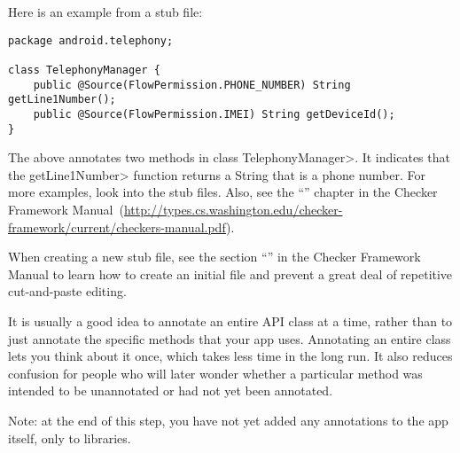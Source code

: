 Here is an example from a stub file:

\begin{Verbatim}
package android.telephony;

class TelephonyManager {
    public @Source(FlowPermission.PHONE_NUMBER) String getLine1Number();
    public @Source(FlowPermission.IMEI) String getDeviceId();
}
\end{Verbatim}

\noindent
The above annotates two methods in class \<TelephonyManager>.
It indicates that the \<getLine1Number> function returns a String that is a
phone number.  For more examples, look into the stub files. Also, see 
the
``'' chapter in the Checker Framework Manual\ifhevea\else\ (\url{http://types.cs.washington.edu/checker-framework/current/checkers-manual.pdf})\fi.


When creating a new stub file, see the section
``'' in the Checker Framework Manual to learn how to create an
initial file and prevent a great deal of repetitive cut-and-paste editing.


It is usually a good idea to annotate an entire API class at a time, rather
than to just annotate the specific methods that your app uses.  Annotating
an entire class lets you think about it once, which takes less time in the
long run.  It also reduces confusion for people who will later wonder
whether a particular method was intended to be unannotated or had not yet
been annotated.


Note: at the end of this step, you have not yet added any annotations to
the app itself, only to libraries.

%
%
%
%
%
%
%
%


